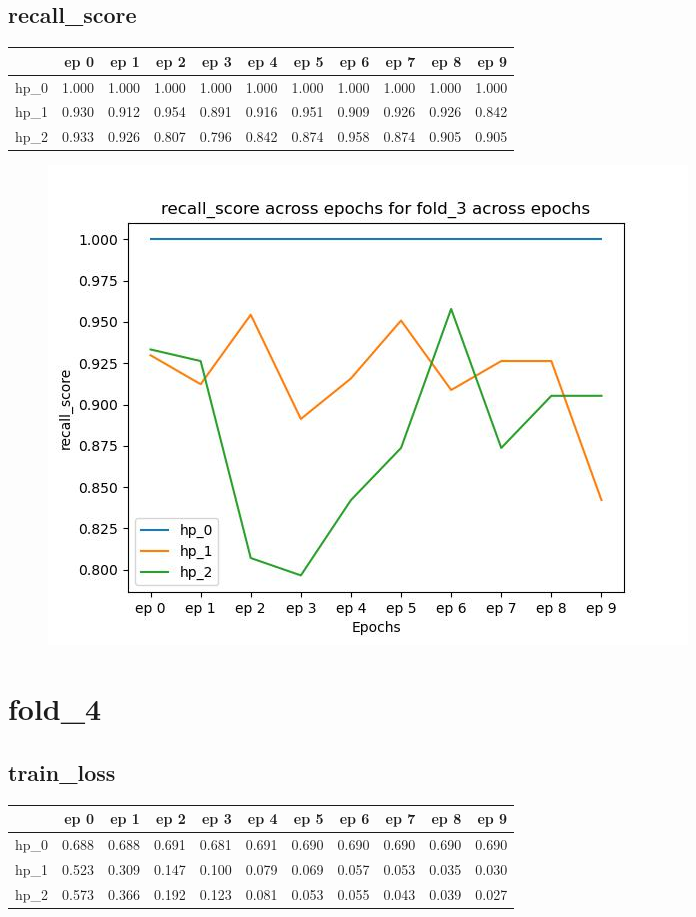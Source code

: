 \documentclass{article}
\begin{document}
\subsection{recall\_score}
\begin{tabular}{lrrrrrrrrrr}
\toprule
{} &   ep 0 &   ep 1 &   ep 2 &   ep 3 &   ep 4 &   ep 5 &   ep 6 &   ep 7 &   ep 8 &   ep 9 \\
\midrule
hp\_0 &  1.000 &  1.000 &  1.000 &  1.000 &  1.000 &  1.000 &  1.000 &  1.000 &  1.000 &  1.000 \\
hp\_1 &  0.930 &  0.912 &  0.954 &  0.891 &  0.916 &  0.951 &  0.909 &  0.926 &  0.926 &  0.842 \\
hp\_2 &  0.933 &  0.926 &  0.807 &  0.796 &  0.842 &  0.874 &  0.958 &  0.874 &  0.905 &  0.905 \\
\bottomrule
\end{tabular}

\begin{figure}[H]
\includegraphics[scale = 0.75]{fold_3/recall_score}
\end{figure}
\section{fold\_4}
\subsection{train\_loss}
\begin{tabular}{lrrrrrrrrrr}
\toprule
{} &   ep 0 &   ep 1 &   ep 2 &   ep 3 &   ep 4 &   ep 5 &   ep 6 &   ep 7 &   ep 8 &   ep 9 \\
\midrule
hp\_0 &  0.688 &  0.688 &  0.691 &  0.681 &  0.691 &  0.690 &  0.690 &  0.690 &  0.690 &  0.690 \\
hp\_1 &  0.523 &  0.309 &  0.147 &  0.100 &  0.079 &  0.069 &  0.057 &  0.053 &  0.035 &  0.030 \\
hp\_2 &  0.573 &  0.366 &  0.192 &  0.123 &  0.081 &  0.053 &  0.055 &  0.043 &  0.039 &  0.027 \\
\bottomrule
\end{tabular}
\end{document}
